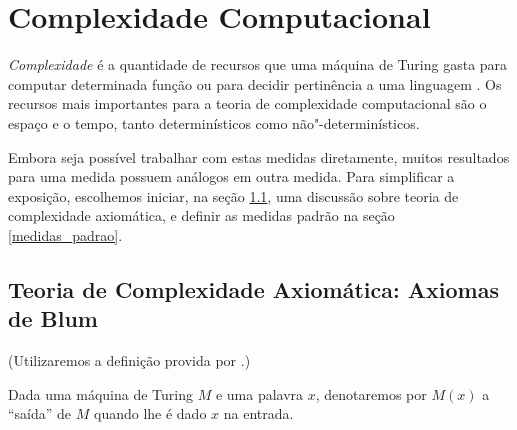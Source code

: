 \chapter{Complexidade Computacional}

\newcommand{\PhiDT}{{\mathcal{T}}} %
\newcommand{\PhiDS}{{\mathcal{S}}} %
\newcommand{\PhiNT}{{\mathcal{N\!T}}} %
\newcommand{\PhiNS}{{\mathcal{N\!S}}} %

\emph{Complexidade} é a quantidade de recursos
que uma máquina de Turing gasta
para computar determinada função
ou para decidir pertinência a uma linguagem
\cite[p. 285]{HopcroftUllman1979}.
Os recursos mais importantes para a teoria de complexidade computacional
são o espaço e o tempo,
tanto determinísticos como não"-determinísticos.

Embora seja possível trabalhar com estas medidas diretamente,
muitos resultados para uma medida
possuem análogos em outra medida.
Para simplificar a exposição,
escolhemos iniciar,
na seção \ref{axiomas_blum},
uma discussão sobre teoria de complexidade axiomática,
e definir as medidas padrão na seção \ref{medidas_padrao}.

\section{Teoria de Complexidade Axiomática: Axiomas de Blum}
\label{axiomas_blum}

(Utilizaremos a definição provida por
.)

Dada uma máquina de Turing $M$
e uma palavra $x$,
denotaremos por $M(x)$ a ``saída''
de $M$ quando lhe é dado $x$ na entrada.

